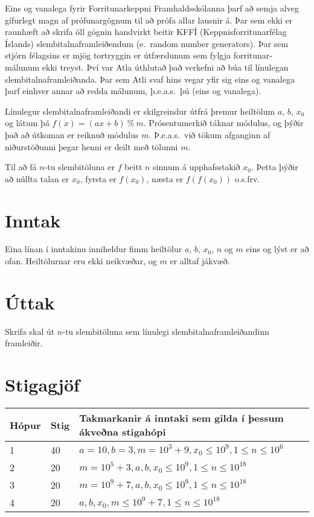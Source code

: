 
Eins og vanalega fyrir Forritunarkeppni Framhaldsskólanna þarf að semja alveg gífurlegt magn
af prófunargögnum til að prófa allar lausnir á. Þar sem ekki er raunhæft að skrifa öll gögnin
handvirkt beitir KFFÍ (Keppnisforritunarfélag Íslands) slembitalnaframleiðendum (e.\ random number
generators). Þar sem stjórn félagsins er mjög tortryggin er útfærslunum sem fylgja forritunar-
málunum ekki treyst. Því var Atla úthlutað það verkefni að búa til línulegan slembitalnaframleiðanda.
Þar sem Atli svaf hins vegar yfir sig eins og vanalega þarf einhver annar að redda málunum, þ.e.a.s.\ 
þú (eins og vanalega).

Línulegur slembitalnaframleiðandi er skilgreindur útfrá þremur heiltölum $a$,
$b$, $x_0$ og látum þá $f(x) = (ax + b)\ \%\ m$. Prósentumerkið táknar módulus,
og þýðir það að útkoman er reiknuð módulus $m$. Þ.e.a.s.\ við tökum afganginn
af niðurstöðunni þegar henni er deilt með tölunni $m$.

Til að fá $n$-tu slembitöluna er $f$ beitt $n$ sinnum á upphafsstakið $x_0$.
Þetta þýðir að núllta talan er $x_0$, fyrsta er $f(x_0)$, næsta er $f(f(x_0))$
o.s.frv.

\section*{Inntak}
Eina línan í inntakinu inniheldur fimm heiltölur $a$, $b$, $x_0$, $n$ og $m$ eins og lýst er að ofan.
Heiltölurnar eru ekki neikvæðar, og $m$ er alltaf jákvæð.

\section*{Úttak}
Skrifa skal út $n$-tu slembitöluna sem línulegi slembitalnaframleiðandinn framleiðir.

\section*{Stigagjöf}
\begin{tabular}{|l|l|l|}
\hline
Hópur & Stig & Takmarkanir á inntaki sem gilda í þessum ákveðna stigahópi \\ \hline
1 & 40 & $a = 10, b = 3, m = 10^3 + 9, x_0 \leq 10^9, 1 \leq n \leq 10^6$ \\ \hline
2 & 20 & $m = 10^5 + 3, a, b, x_0 \leq 10^9, 1 \leq n \leq 10^{18}$ \\ \hline
3 & 20 & $m = 10^9 + 7, a, b, x_0 \leq 10^9, 1 \leq n \leq 10^{18}$ \\ \hline
4 & 20 & $a, b, x_0, m \leq 10^9 + 7, 1 \leq n \leq 10^{18}$ \\ \hline
\end{tabular}
